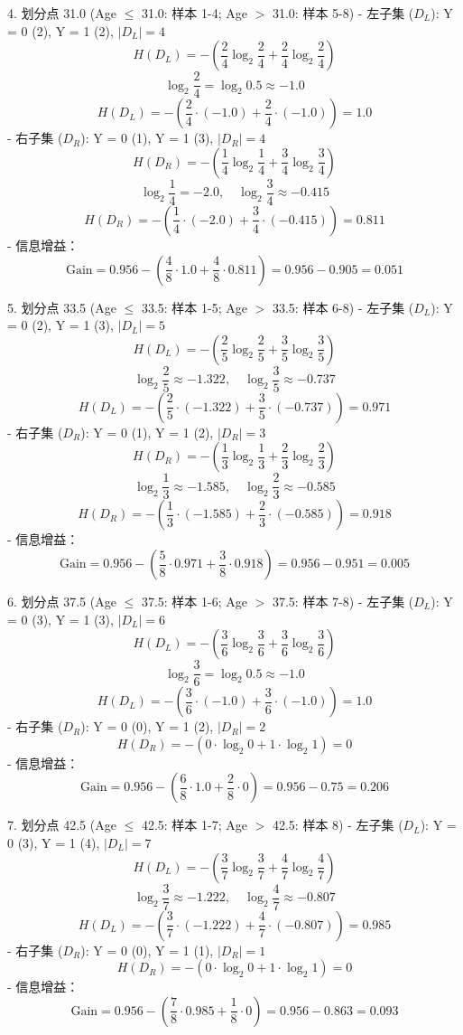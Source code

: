 \documentclass{article}
\begin{document}
4. 划分点 31.0 (Age $\leq$ 31.0: 样本 1-4; Age $>$ 31.0: 样本 5-8)
- 左子集 ($D_L$): Y = 0 (2), Y = 1 (2), $|D_L| = 4$
  \[
  H(D_L) = - \left( \frac{2}{4} \log_2 \frac{2}{4} + \frac{2}{4} \log_2 \frac{2}{4} \right)
  \]
  \[
  \log_2 \frac{2}{4} = \log_2 0.5 \approx -1.0
  \]
  \[
  H(D_L) = - \left( \frac{2}{4} \cdot (-1.0) + \frac{2}{4} \cdot (-1.0) \right) = 1.0
  \]
- 右子集 ($D_R$): Y = 0 (1), Y = 1 (3), $|D_R| = 4$
  \[
  H(D_R) = - \left( \frac{1}{4} \log_2 \frac{1}{4} + \frac{3}{4} \log_2 \frac{3}{4} \right)
  \]
  \[
  \log_2 \frac{1}{4} = -2.0, \quad \log_2 \frac{3}{4} \approx -0.415
  \]
  \[
  H(D_R) = - \left( \frac{1}{4} \cdot (-2.0) + \frac{3}{4} \cdot (-0.415) \right) = 0.811
  \]
- 信息增益：
  \[
  \text{Gain} = 0.956 - \left( \frac{4}{8} \cdot 1.0 + \frac{4}{8} \cdot 0.811 \right) = 0.956 - 0.905 = 0.051
  \]

5. 划分点 33.5 (Age $\leq$ 33.5: 样本 1-5; Age $>$ 33.5: 样本 6-8)
- 左子集 ($D_L$): Y = 0 (2), Y = 1 (3), $|D_L| = 5$
  \[
  H(D_L) = - \left( \frac{2}{5} \log_2 \frac{2}{5} + \frac{3}{5} \log_2 \frac{3}{5} \right)
  \]
  \[
  \log_2 \frac{2}{5} \approx -1.322, \quad \log_2 \frac{3}{5} \approx -0.737
  \]
  \[
  H(D_L) = - \left( \frac{2}{5} \cdot (-1.322) + \frac{3}{5} \cdot (-0.737) \right) = 0.971
  \]
- 右子集 ($D_R$): Y = 0 (1), Y = 1 (2), $|D_R| = 3$
  \[
  H(D_R) = - \left( \frac{1}{3} \log_2 \frac{1}{3} + \frac{2}{3} \log_2 \frac{2}{3} \right)
  \]
  \[
  \log_2 \frac{1}{3} \approx -1.585, \quad \log_2 \frac{2}{3} \approx -0.585
  \]
  \[
  H(D_R) = - \left( \frac{1}{3} \cdot (-1.585) + \frac{2}{3} \cdot (-0.585) \right) = 0.918
  \]
- 信息增益：
  \[
  \text{Gain} = 0.956 - \left( \frac{5}{8} \cdot 0.971 + \frac{3}{8} \cdot 0.918 \right) = 0.956 - 0.951 = 0.005
  \]

6. 划分点 37.5 (Age $\leq$ 37.5: 样本 1-6; Age $>$ 37.5: 样本 7-8)
- 左子集 ($D_L$): Y = 0 (3), Y = 1 (3), $|D_L| = 6$
  \[
  H(D_L) = - \left( \frac{3}{6} \log_2 \frac{3}{6} + \frac{3}{6} \log_2 \frac{3}{6} \right)
  \]
  \[
  \log_2 \frac{3}{6} = \log_2 0.5 \approx -1.0
  \]
  \[
  H(D_L) = - \left( \frac{3}{6} \cdot (-1.0) + \frac{3}{6} \cdot (-1.0) \right) = 1.0
  \]
- 右子集 ($D_R$): Y = 0 (0), Y = 1 (2), $|D_R| = 2$
  \[
  H(D_R) = - \left( 0 \cdot \log_2 0 + 1 \cdot \log_2 1 \right) = 0
  \]
- 信息增益：
  \[
  \text{Gain} = 0.956 - \left( \frac{6}{8} \cdot 1.0 + \frac{2}{8} \cdot 0 \right) = 0.956 - 0.75 = 0.206
  \]

7. 划分点 42.5 (Age $\leq$ 42.5: 样本 1-7; Age $>$ 42.5: 样本 8)
- 左子集 ($D_L$): Y = 0 (3), Y = 1 (4), $|D_L| = 7$
  \[
  H(D_L) = - \left( \frac{3}{7} \log_2 \frac{3}{7} + \frac{4}{7} \log_2 \frac{4}{7} \right)
  \]
  \[
  \log_2 \frac{3}{7} \approx -1.222, \quad \log_2 \frac{4}{7} \approx -0.807
  \]
  \[
  H(D_L) = - \left( \frac{3}{7} \cdot (-1.222) + \frac{4}{7} \cdot (-0.807) \right) = 0.985
  \]
- 右子集 ($D_R$): Y = 0 (0), Y = 1 (1), $|D_R| = 1$
  \[
  H(D_R) = - \left( 0 \cdot \log_2 0 + 1 \cdot \log_2 1 \right) = 0
  \]
- 信息增益：
  \[
  \text{Gain} = 0.956 - \left( \frac{7}{8} \cdot 0.985 + \frac{1}{8} \cdot 0 \right) = 0.956 - 0.863 = 0.093
  \]
\end{document}
